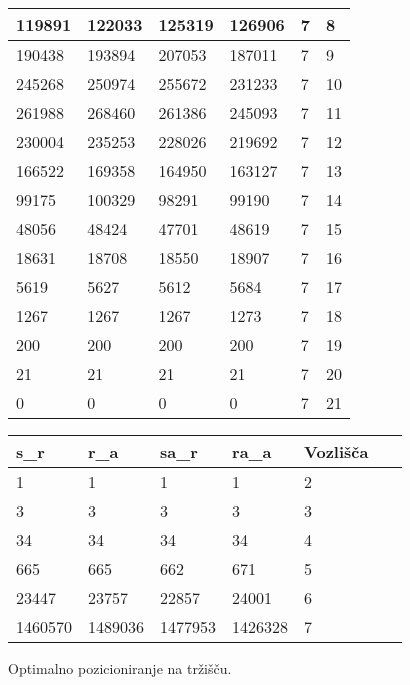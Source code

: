 \documentclass[fin1, tisk]{fmfdelo}
\begin{document}
\begin{table}[!ht]
\begin{tabular}{|l|l|l|l|l|l|}
        119891 & 122033 & 125319 & 126906 & 7 & 8 \\ \hline
        190438 & 193894 & 207053 & 187011 & 7 & 9 \\ \hline
        245268 & 250974 & 255672 & 231233 & 7 & 10 \\ \hline
        261988 & 268460 & 261386 & 245093 & 7 & 11 \\ \hline
        230004 & 235253 & 228026 & 219692 & 7 & 12 \\ \hline
        166522 & 169358 & 164950 & 163127 & 7 & 13 \\ \hline
        99175 & 100329 & 98291 & 99190 & 7 & 14 \\ \hline
        48056 & 48424 & 47701 & 48619 & 7 & 15 \\ \hline
        18631 & 18708 & 18550 & 18907 & 7 & 16 \\ \hline
        5619 & 5627 & 5612 & 5684 & 7 & 17 \\ \hline
        1267 & 1267 & 1267 & 1273 & 7 & 18 \\ \hline
        200 & 200 & 200 & 200 & 7 & 19 \\ \hline
        21 & 21 & 21 & 21 & 7 & 20 \\ \hline
        0 & 0 & 0 & 0 & 7 & 21 \\ \hline
    \end{tabular}
\end{table}



\begin{table}[!ht]
    \centering
    \begin{tabular}{|l|l|l|l|l|l|}
    \hline
        s\_r & r\_a & sa\_r & ra\_a & Vozlišča & ~ \\ \hline
        1 & 1 & 1 & 1 & 2 & ~ \\ \hline
        3 & 3 & 3 & 3 & 3 & ~ \\ \hline
        34 & 34 & 34 & 34 & 4 & ~ \\ \hline
        665 & 665 & 662 & 671 & 5 & ~ \\ \hline
        23447 & 23757 & 22857 & 24001 & 6 & ~ \\ \hline
        1460570 & 1489036 & 1477953 & 1426328 & 7 & ~ \\ \hline
    \end{tabular}
\end{table}






Optimalno pozicioniranje na tržišču. 
\end{document}
